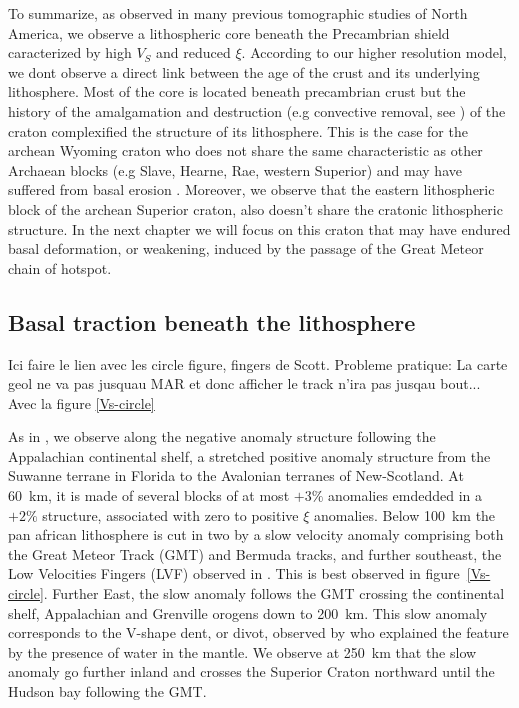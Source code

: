 \documentclass[12pt]{article}
\begin{document}
		To summarize, as observed in many previous tomographic studies of North America, we observe a lithospheric core beneath the Precambrian shield caracterized by high $V_S$ and reduced $\xi$. 
		According to our higher resolution model, we dont observe a direct link between the age of the crust and its underlying lithosphere. Most of the core is located beneath precambrian crust but the history of the amalgamation and destruction (e.g convective removal, see \cite{lee2011building}) of the craton complexified the structure of its lithosphere. 
		This is the case for the archean Wyoming craton who does not share the same characteristic as other Archaean blocks (e.g Slave, Hearne, Rae, western Superior) and may have suffered from basal erosion \citep{s2005archean,lee2011building}. 
		Moreover, we observe that the eastern lithospheric block of the archean Superior craton, also doesn't share the cratonic lithospheric structure. In the next chapter we will focus on this craton that may have endured basal deformation, or weakening, induced by the passage of the Great Meteor chain of hotspot.

	\subsection{Basal traction beneath the lithosphere}

	Ici faire le lien avec les circle figure, fingers de Scott. Probleme pratique: La carte geol ne va pas jusquau MAR et donc afficher le track n'ira pas jusqau bout...  Avec la figure \ref{Vs-circle}

		As in \cite{schaeffer2014imaging,yuan2014lithospheric,james2014rayleigh,silveira2002anisotropic,mocquet1990three}, we observe along the negative anomaly structure following the Appalachian continental shelf, a stretched positive anomaly structure from the Suwanne terrane in Florida to the Avalonian terranes of New-Scotland. 
		At 60~km, it is made of several blocks of at most $+3\%$ anomalies emdedded in a $+2\%$ structure, associated with zero to positive $\xi$ anomalies. Below 100~km the pan african lithosphere \citep{yuan2014lithospheric} is cut in two by a slow velocity anomaly comprising both the Great Meteor Track (GMT) and Bermuda tracks, and further southeast, the Low Velocities Fingers (LVF) observed in \cite{french2013waveform}. This is best observed in figure~\ref{Vs-circle}. 
		Further East, the slow anomaly follows the GMT crossing the continental shelf, Appalachian and Grenville orogens down to 200~km. This slow anomaly corresponds to the V-shape dent, or divot, observed by \cite{lee1997upper} who explained the feature by the presence of water in the mantle. We observe at 250~km that the slow anomaly go further inland and crosses the Superior Craton northward until the Hudson bay following the GMT.
\end{document}

